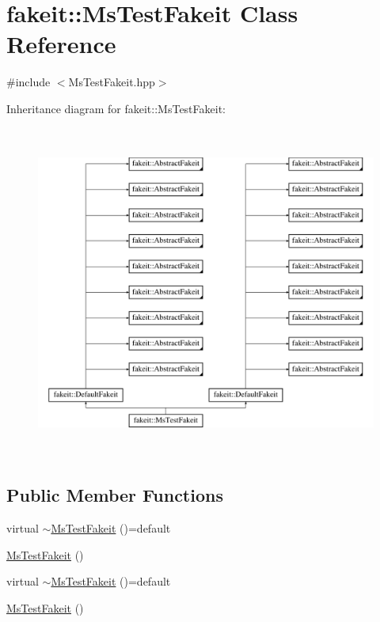\hypertarget{classfakeit_1_1MsTestFakeit}{}\section{fakeit\+::Ms\+Test\+Fakeit Class Reference}
\label{classfakeit_1_1MsTestFakeit}


{\ttfamily \#include $<$Ms\+Test\+Fakeit.\+hpp$>$}

Inheritance diagram for fakeit\+::Ms\+Test\+Fakeit\+:\begin{figure}[H]
\begin{center}
\leavevmode
\includegraphics[height=11.000000cm]{classfakeit_1_1MsTestFakeit}
\end{center}
\end{figure}
\subsection*{Public Member Functions}
\begin{DoxyCompactItemize}
\item 
virtual \mbox{\hyperlink{classfakeit_1_1MsTestFakeit_ae352eaceb462fe8332c51c9d15a46ec6}{$\sim$\+Ms\+Test\+Fakeit}} ()=default
\item 
\mbox{\hyperlink{classfakeit_1_1MsTestFakeit_a8d0e09aa25eb9a1a8a2e67cb2ec9b39d}{Ms\+Test\+Fakeit}} ()
\item 
virtual \mbox{\hyperlink{classfakeit_1_1MsTestFakeit_ae352eaceb462fe8332c51c9d15a46ec6}{$\sim$\+Ms\+Test\+Fakeit}} ()=default
\item 
\mbox{\hyperlink{classfakeit_1_1MsTestFakeit_a8d0e09aa25eb9a1a8a2e67cb2ec9b39d}{Ms\+Test\+Fakeit}} ()
\end{DoxyCompactItemize}
